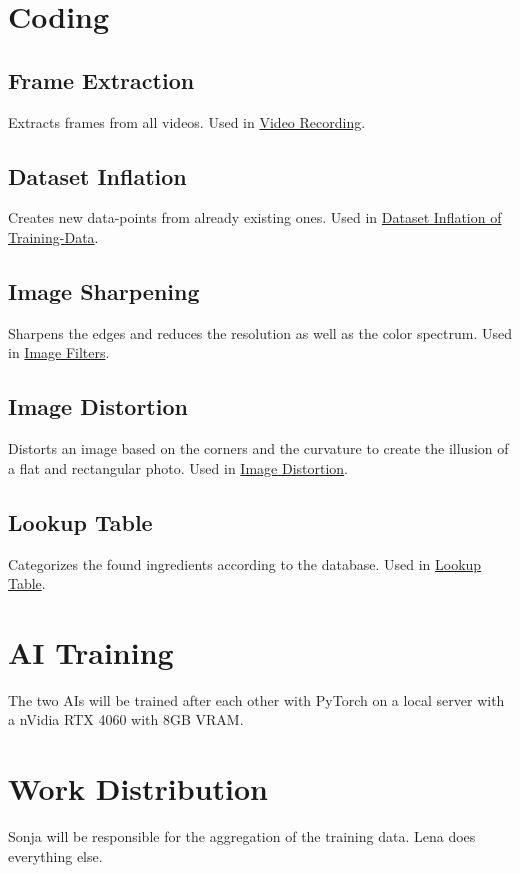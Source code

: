 \documentclass[a4paper,11pt]{report}
\begin{document}
        \section{Coding}

            \subsection{Frame Extraction}
                Extracts frames from all videos. Used in \hyperref[subsec:data:recording]{Video Recording}.

            \subsection{Dataset Inflation}
                Creates new data-points from already existing ones. Used in \hyperref[subsec:data:inflation]{Dataset Inflation of Training-Data}.

            \subsection{Image Sharpening}
                Sharpens the edges and reduces the resolution as well as the color spectrum. Used in \hyperref[subsec:architecture:filters]{Image Filters}.

            \subsection{Image Distortion}
                Distorts an image based on the corners and the curvature to create the illusion of a flat and rectangular photo. Used in \hyperref[subsec:architecture:distortion]{Image Distortion}.

            \subsection{Lookup Table}
                Categorizes the found ingredients according to the database. Used in \hyperref[subsec:architecture:table]{Lookup Table}.

        \section{AI Training}
            The two AIs will be trained after each other with PyTorch \cite{pytorch} on a local server with a nVidia RTX 4060 with 8GB VRAM.

        \section{Work Distribution}
            Sonja will be responsible for the aggregation of the training data. Lena does everything else.
            
\end{document}
